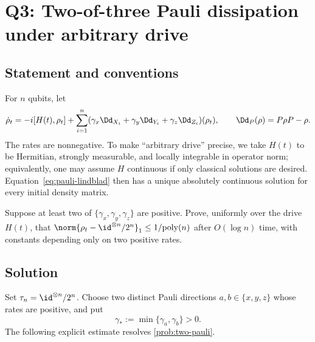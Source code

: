 \documentclass[class=article,11pt,a4paper,crop=false]{standalone}
\begin{document}
\section{Q3: Two-of-three Pauli dissipation under arbitrary drive}
\label{sec:pauli}

\subsection{Statement and conventions}

For $n$ qubits, let
\begin{equation}\label{eq:pauli-lindblad}
 \dot\rho_t=-i[H(t),\rho_t]
 +\sum_{i=1}^n(\gamma_x\Dd_{X_i}+\gamma_y\Dd_{Y_i}
 +\gamma_z\Dd_{Z_i})(\rho_t),
 \qquad \Dd_P(\rho)=P\rho P-\rho.
\end{equation}
The rates are nonnegative. To make ``arbitrary drive'' precise, we take
$H(t)$ to be Hermitian, strongly measurable, and locally integrable in
operator norm; equivalently, one may assume $H$ continuous if only classical
solutions are desired. Equation~\eqref{eq:pauli-lindblad} then has a unique
absolutely continuous solution for every initial density matrix.

\begin{problem}\label{prob:two-pauli}
Suppose at least two of $\{\gamma_x,\gamma_y,\gamma_z\}$ are positive. Prove,
uniformly over the drive $H(t)$, that
$\norm{\rho_t-\id^{\otimes n}/2^n}_1\le 1/\mathrm{poly}(n)$ after
$O(\log n)$ time, with constants depending only on two positive rates.
\end{problem}

\subsection{Solution}

Set $\tau_n=\id^{\otimes n}/2^n$. Choose two distinct Pauli directions
$a,b\in\{x,y,z\}$ whose rates are positive, and put
\begin{equation}\label{eq:gamma-star}
 \gamma_*:=\min\{\gamma_a,\gamma_b\}>0.
\end{equation}
The following explicit estimate resolves \cref{prob:two-pauli}.
\end{document}
